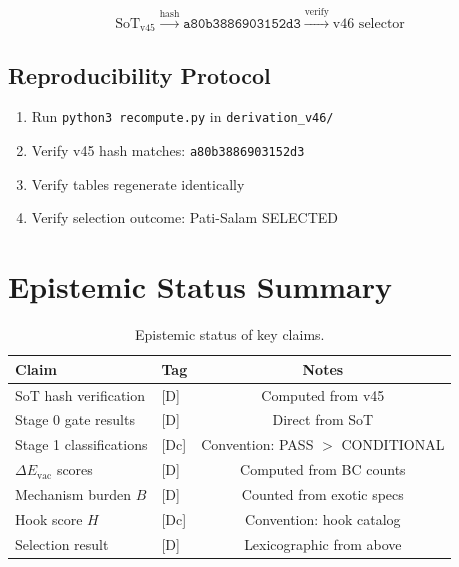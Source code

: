 \documentclass[11pt,a4paper]{article}
\begin{document}
\begin{equation}
\label{eq:hash-chain}
\text{SoT}_{\text{v45}} \xrightarrow{\text{hash}} \texttt{a80b3886903152d3} \xrightarrow{\text{verify}} \text{v46 selector}
\end{equation}

\subsection{Reproducibility Protocol}
\label{subsec:repro-protocol}

\begin{enumerate}
\item Run \texttt{python3 recompute.py} in \texttt{derivation\_v46/}
\item Verify v45 hash matches: \texttt{a80b3886903152d3}
\item Verify tables regenerate identically
\item Verify selection outcome: Pati-Salam SELECTED
\end{enumerate}

\section{Epistemic Status Summary}
\label{sec:epistemic}

\begin{table}[ht]
\centering
\caption{Epistemic status of key claims.}
\label{tab:epistemic-summary}
\begin{tabular}{llc}
\toprule
Claim & Tag & Notes \\
\midrule
SoT hash verification & [D] & Computed from v45 \\
Stage 0 gate results & [D] & Direct from SoT \\
Stage 1 classifications & [Dc] & Convention: PASS $>$ CONDITIONAL \\
$\Delta E_{\text{vac}}$ scores & [D] & Computed from BC counts \\
Mechanism burden $B$ & [D] & Counted from exotic specs \\
Hook score $H$ & [Dc] & Convention: hook catalog \\
Selection result & [D] & Lexicographic from above \\
\bottomrule
\end{tabular}
\end{table}
\end{document}
